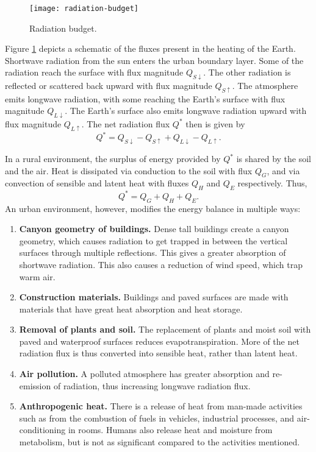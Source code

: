 	\begin{figure}	
		\centering
		\texttt{[image: radiation-budget]}
		\caption{Radiation budget.}
		\label{fig:radiation-budget}
	\end{figure}

	Figure \ref{fig:radiation-budget} depicts a schematic of the fluxes present in the heating of the Earth.
	Shortwave radiation from the sun enters the urban boundary layer.
	Some of the radiation reach the surface with flux magnitude $Q_{S\downarrow}$.
	The other radiation is reflected or scattered back upward with flux magnitude $Q_{S\uparrow}$.
	The atmosphere emits longwave radiation, with some
	reaching the Earth’s surface with flux magnitude $Q_{L\downarrow}$.
	The Earth’s surface also emits longwave radiation upward with flux magnitude $Q_{L\uparrow}$. 
	The net radiation flux $Q^*$ then is given by
	\begin{equation}
		Q^* = Q_{S\downarrow} - Q_{S\uparrow} + Q_{L\downarrow} - Q_{L\uparrow}.
	\end{equation}
		
	In a rural environment, the surplus of energy provided by $Q^*$ is shared by the soil and the air.
	Heat is dissipated via conduction to the soil with flux $Q_G$,
		and via convection of sensible and latent heat with fluxes $Q_H$ and $Q_E$ respectively. 
	Thus,
	\begin{equation}
		Q^* = Q_G + Q_H + Q_E.
	\end{equation}
	An urban environment, however, modifies the energy balance in multiple ways:
	\begin{enumerate}
		\item \textbf{Canyon geometry of buildings.}
		Dense tall buildings create a canyon geometry,
			which causes radiation to get trapped in between the vertical surfaces through multiple reflections.
		This gives a greater absorption of shortwave radiation.
		This also causes a reduction of wind speed, which trap warm air.
		
		\item \textbf{Construction materials.}
		Buildings and paved surfaces are made with materials that have great heat absorption and heat storage.
		
		\item \textbf{Removal of plants and soil.}
		The replacement of plants and moist soil with paved and waterproof surfaces reduces evapotranspiration.
		More of the net radiation flux is thus converted into sensible heat, rather than latent heat.
		
		\item \textbf{Air pollution.}
		A polluted atmosphere has greater absorption and re-emission of radiation, thus increasing longwave radiation flux.
		
		\item \textbf{Anthropogenic heat.}
		There is a release of heat from man-made activities such as from
			the combustion of fuels in vehicles,
			industrial processes, and
			air-conditioning in rooms.
		Humans also release heat and moisture from metabolism, but is not as significant compared to the activities mentioned.
	\end{enumerate}

